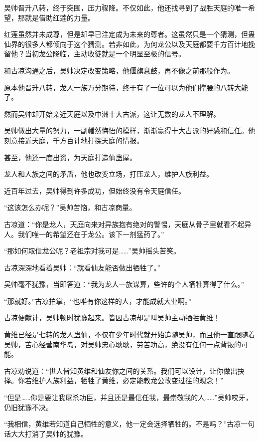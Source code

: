 
\begin{this_body}

吴帅晋升八转，终于突围，压力骤降。不仅如此，他还找寻到了战胜天庭的唯一希望，那就是借助红莲的力量。

红莲虽然并未成尊，但是却早已注定成为未来的尊者。这虽然只是一个猜测，但蛊仙界的很多人都倾向于这个猜测。若非如此，为何龙公以及天庭都要千方百计地挽留他？当初龙公降临，主动收徒就是一个明显至极的信号。

和古凉沟通之后，吴帅决定改变策略，他偃旗息鼓，再不像之前那般作为。

原本他晋升八转，龙人一族万分期待，终于有了一位可以为他们撑腰的八转大能了。

然而吴帅却开始亲近天庭以及中洲十大古派，这让无数的龙人不理解。

吴帅做出大量的努力，一副幡然悔悟的模样，渐渐赢得十大古派的好感和信任。他刻意接近天庭，千方百计地打探天庭的情报。

甚至，他还一度出资，为天庭打造仙蛊屋。

龙人和人族之间的矛盾，他也改变立场，打压龙人，维护人族利益。

近百年过去，吴帅得到许多成功，但始终没有令天庭信任。

“这该怎么办呢？”吴帅苦恼，和古凉商量。

古凉道：“你是龙人，天庭向来对异族抱有绝对的警惕，天庭从骨子里就看不起异人。我们唯一的希望还在于龙公。该下一剂猛药了。”

“那如何取信龙公呢？老祖宗对我可是……”吴帅摇头苦笑。

古凉深深地看着吴帅：“就看仙友能否做出牺牲了。”

吴帅毫不犹豫，当即答道：“我为龙人一族谋算，些许的个人牺牲算得了什么。”

“那就好。”古凉拍掌，“也唯有你这样的人，才能成就大业啊。”

古凉便献计，吴帅顿时犹豫起来。皆因古凉却是叫吴帅主动牺牲黄维！

黄维已经是七转的龙人蛊仙，不仅在少年时代就开始追随吴帅，而且他一直跟随着吴帅，苦心经营南华岛，对吴帅忠心耿耿，劳苦功高，绝没有任何一点背叛的可能。

古凉劝说道：“世人皆知黄维和仙友你之间的关系。我们可以设计，让你做出抉择。你若维护人族利益，牺牲了黄维，必定能教龙公改变过往的观念！”

“但是……你是要让我屠杀功臣，并且还是最信任我，最崇敬我的人……”吴帅咬牙，仍旧犹豫不决。

“我相信，黄维若知道自己牺牲的意义，他一定会选择牺牲的。不是吗？”古凉一句话大大打消了吴帅的犹豫。


\end{this_body}
